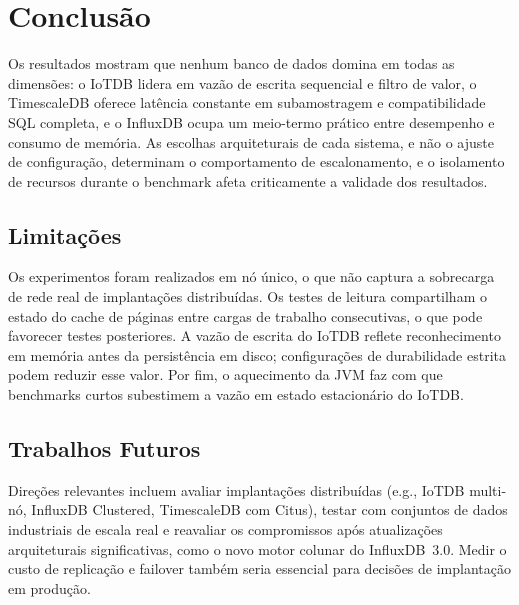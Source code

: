 \section{Conclusão}
\label{sec:conclusion}

Os resultados mostram que nenhum banco de dados domina em todas as dimensões: o IoTDB lidera
em vazão de escrita sequencial e filtro de valor, o TimescaleDB oferece latência constante
em subamostragem e compatibilidade SQL completa, e o InfluxDB ocupa um meio-termo prático
entre desempenho e consumo de memória. As escolhas arquiteturais de cada sistema, e não o
ajuste de configuração, determinam o comportamento de escalonamento, e o isolamento de
recursos durante o benchmark afeta criticamente a validade dos resultados.

\subsection{Limitações}
\label{sec:limitations}

Os experimentos foram realizados em nó único, o que não captura a sobrecarga de rede real
de implantações distribuídas. Os testes de leitura compartilham o estado do cache de páginas
entre cargas de trabalho consecutivas, o que pode favorecer testes posteriores. A vazão de
escrita do IoTDB reflete reconhecimento em memória antes da persistência em disco;
configurações de durabilidade estrita podem reduzir esse valor. Por fim, o aquecimento da
JVM faz com que benchmarks curtos subestimem a vazão em estado estacionário do IoTDB.

\subsection{Trabalhos Futuros}
\label{sec:future-work}

Direções relevantes incluem avaliar implantações distribuídas (e.g., IoTDB multi-nó, InfluxDB
Clustered, TimescaleDB com Citus), testar com conjuntos de dados industriais de escala real
e reavaliar os compromissos após atualizações arquiteturais significativas, como o novo
motor colunar do InfluxDB~3.0. Medir o custo de replicação e failover também seria
essencial para decisões de implantação em produção.
